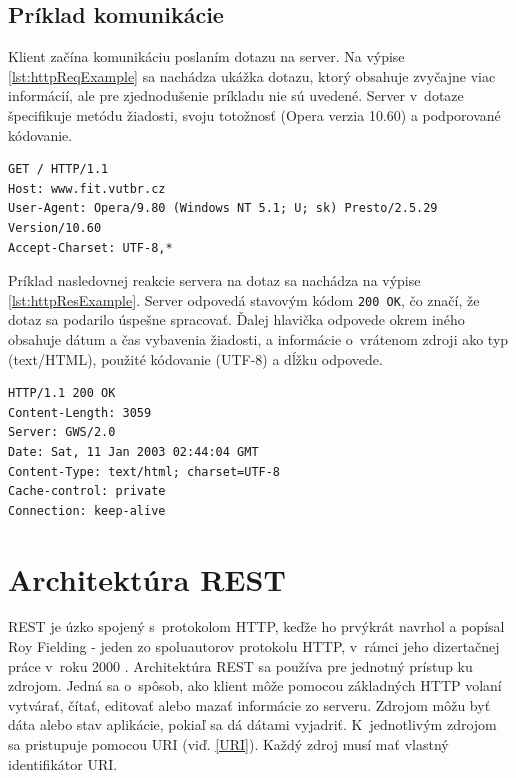 \documentclass[slovak]{fitthesis}
\begin{document}
\newpage

\subsection{Príklad komunikácie}

Klient začína komunikáciu poslaním dotazu na server. Na výpise \ref{lst:httpReqExample} sa nachádza ukážka dotazu, ktorý obsahuje zvyčajne viac informácií, ale pre zjednodušenie príkladu nie sú uvedené. Server v~dotaze špecifikuje metódu žiadosti, svoju totožnosť (Opera verzia 10.60) a podporované kódovanie.
\begin{lstlisting}[caption=príklad HTTP dotazu,frame=tlrb,label={lst:httpReqExample}]
GET / HTTP/1.1
Host: www.fit.vutbr.cz
User-Agent: Opera/9.80 (Windows NT 5.1; U; sk) Presto/2.5.29 Version/10.60
Accept-Charset: UTF-8,*
\end{lstlisting}
Príklad nasledovnej reakcie servera na dotaz sa nachádza na výpise \ref{lst:httpResExample}. Server odpovedá stavovým kódom \texttt{200 OK}, čo značí, že dotaz sa podarilo úspešne spracovať. Ďalej hlavička odpovede okrem iného obsahuje dátum a čas vybavenia žiadosti, a informácie o~vrátenom zdroji ako typ (text/HTML), použité kódovanie (UTF-8) a dĺžku odpovede. 
\begin{lstlisting}[caption=príklad HTTP odpovedi,frame=tlrb,label={lst:httpResExample}]
HTTP/1.1 200 OK
Content-Length: 3059
Server: GWS/2.0
Date: Sat, 11 Jan 2003 02:44:04 GMT
Content-Type: text/html; charset=UTF-8
Cache-control: private
Connection: keep-alive
\end{lstlisting}



\section{Architektúra REST}\label{rest}
REST je úzko spojený s~protokolom HTTP, keďže ho prvýkrát navrhol a popísal Roy Fielding - jeden zo spoluautorov protokolu HTTP, v~rámci jeho dizertačnej práce v~roku 2000 \cite{dizertackaREST}.
Architektúra REST sa používa pre jednotný prístup ku zdrojom. Jedná sa o~spôsob, ako klient môže pomocou základných HTTP volaní vytvárať, čítať, editovať alebo mazať informácie zo serveru. Zdrojom môžu byť dáta alebo stav aplikácie, pokiaľ sa dá dátami vyjadriť. K~jednotlivým zdrojom sa pristupuje pomocou URI (viď. \ref{URI}). Každý zdroj musí mať vlastný identifikátor URI.
\end{document}

